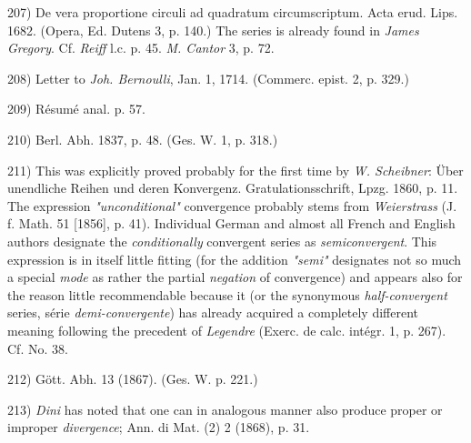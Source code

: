\vfill
\leftline{\rule{2in}{0.4pt}}
\vspace{0.2cm}
{
\footnotesize
207) De vera proportione circuli ad quadratum circumscriptum. Acta erud. Lips. 1682. (Opera, Ed. Dutens 3, p. 140.) The series is already found in \textit{James Gregory}. Cf. \textit{Reiff} l.c. p. 45. \textit{M. Cantor} 3, p. 72.

208) Letter to \textit{Joh. Bernoulli}, Jan. 1, 1714. (Commerc. epist. 2, p. 329.)

209) Résumé anal. p. 57.

210) Berl. Abh. 1837, p. 48. (Ges. W. 1, p. 318.)

211) This was explicitly proved probably for the first time by \textit{W. Scheibner}: Über unendliche Reihen und deren Konvergenz. Gratulationsschrift, Lpzg. 1860, p. 11. The expression \textit{"unconditional"} convergence probably stems from \textit{Weierstrass} (J. f. Math. 51 [1856], p. 41). Individual German and almost all French and English authors designate the \textit{conditionally} convergent series as \textit{semiconvergent}. This expression is in itself little fitting (for the addition \textit{"semi"} designates not so much a special \textit{mode} as rather the partial \textit{negation} of convergence) and appears also for the reason little recommendable because it (or the synonymous \textit{half-convergent} series, série \textit{demi-convergente}) has already acquired a completely different meaning following the precedent of \textit{Legendre} (Exerc. de calc. intégr. 1, p. 267). Cf. No. 38.

212) Gött. Abh. 13 (1867). (Ges. W. p. 221.)

213) \textit{Dini} has noted that one can in analogous manner also produce proper or improper \textit{divergence}; Ann. di Mat. (2) 2 (1868), p. 31.

}